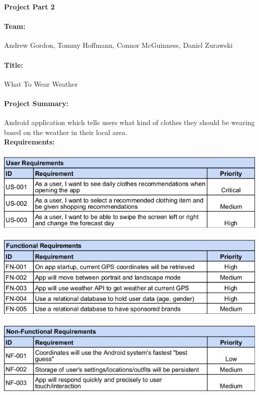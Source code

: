 \documentclass[12pt,a4paper]{article}
\begin{document}

\noindent\textbf{Project Part 2}

\paragraph{Team:}Andrew Gordon, Tommy Hoffmann, Connor McGuinness, Daniel Zurawski

\paragraph{Title:}What To Wear Weather

\paragraph{Project Summary:}Android application which tells users what kind
of clothes they should be wearing based on the weather in their local area.
\\

\noindent\textbf{Requirements:}
\\\\
\includegraphics[scale=0.7]{user.png}\\\\
\includegraphics[scale=0.7]{functional.png}\\\\
\includegraphics[scale=0.7]{non-functional.png}\\\\
\end{document}
